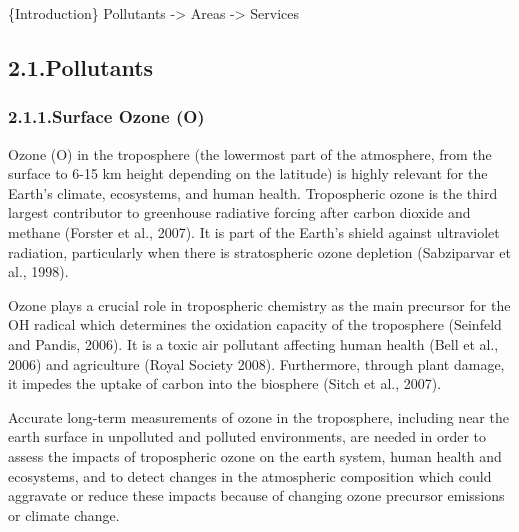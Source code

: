 \documentclass[9pt]{report}
\begin{document}
\noindent{}\{Introduction\}
Pollutants -\textgreater{} Areas -\textgreater{} Services%

\subsection{2.1.\hspace*{0.5em}Pollutants}\label{sec-pollutants}%

\subsubsection{2.1.1.\hspace*{0.5em}Surface Ozone (O)}\label{sec-surface-ozone-o3}%

\noindent{}Ozone (O) in the troposphere (the lowermost part of the atmosphere, from the surface to 6-15 km height depending on the latitude) is highly relevant for the Earth’s climate, ecosystems, and human health.
Tropospheric ozone is the third largest contributor to greenhouse radiative forcing after carbon dioxide and methane (Forster et al., 2007).
It is part of the Earth’s shield against ultraviolet radiation, particularly when there is stratospheric ozone depletion (Sabziparvar et al., 1998).%

Ozone plays a crucial role in tropospheric chemistry as the main precursor for the OH radical which determines the oxidation capacity of the troposphere (Seinfeld and Pandis, 2006). 
It is a toxic air pollutant affecting human health (Bell et al., 2006) and agriculture (Royal Society 2008).
Furthermore, through plant damage, it impedes the uptake of carbon into the biosphere (Sitch et al., 2007).%

Accurate long-term measurements of ozone in the troposphere, including near the earth surface in unpolluted and polluted environments, are needed in order to assess the impacts of tropospheric ozone on the earth system, human health and ecosystems, and to detect changes in the atmospheric composition which could aggravate or reduce these impacts because of changing ozone precursor emissions or climate change.%

\end{document}

